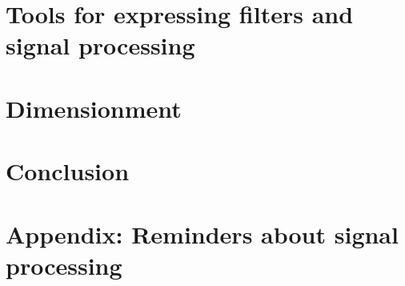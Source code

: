 \documentclass[twoside]{article}
\theoremstyle{remark}
\numberwithin{equation}{subsection}
\begin{document}
\section{Tools for expressing filters and signal processing}


\newpage
\section{Dimensionment}


%

\section*{Conclusion}


\newpage
\section*{Appendix: Reminders about signal processing}

\end{document}

